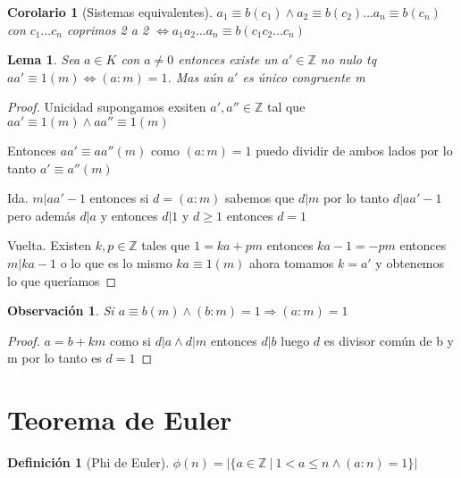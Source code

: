\documentclass{article}
\theoremstyle{break}
\newtheorem{corollary}{Corolario}[theorem]
\newtheorem{lemma}[theorem]{Lema}
\newtheorem*{remark}{Observación}
\newtheorem{definition}{Definición}[section]
\def \Z{\mathbb{Z}}
\begin{document}
        \begin{corollary}[Sistemas equivalentes]
            $a_1\equiv b (c_1) \land a_2\equiv b (c_2) \ldots a_n\equiv b(c_n)$ con $c_1\ldots c_n$ coprimos
            2 a 2 $\iff a_1a_2\ldots a_n \equiv b (c_1c_2\ldots c_n)$ 
        \end{corollary}


        \begin{lemma}
            Sea $a\in K$ con $a\neq 0$ entonces existe un $a'\in\Z$ no nulo tq $aa' \equiv 1(m) \iff (a:m)=1$.
            Mas aún $a'$ es único congruente m
        \end{lemma}
        \begin{proof}
            Unicidad supongamos exsiten $a',a''\in\Z$ tal que $aa'\equiv 1(m) \land aa''\equiv 1(m)$

            Entonces $aa'\equiv aa''(m)$ como $(a:m)=1$ puedo dividir de ambos lados
            por lo tanto $a'\equiv a'' (m)$

            Ida. $m|aa'-1$ entonces si $d=(a:m)$ sabemos que $d|m$ por lo tanto $d|aa'-1$ pero además 
             $d|a$ y entonces $d|1$ y $d\geq 1$ entonces $d=1$
            
            Vuelta. Existen $k,p\in\Z$ tales que $1 = ka + pm$ entonces $ka-1 = -pm$ entonces $m|ka-1$
            o lo que es lo mismo $ka\equiv 1(m)$ ahora tomamos $k=a'$ y obtenemos lo que queríamos
        \end{proof}

        \begin{remark}
            Si $a\equiv b(m) \land (b:m)=1 \Rightarrow (a:m)=1$
        \end{remark}
        \begin{proof}
            $a=b+km$ como si $d|a \land d|m$ entonces $d|b$ luego $d$ es divisor común de b y m
            por lo tanto es $d=1$
        \end{proof}


        \section{Teorema de Euler}
        \begin{definition}[Phi de Euler]
            $\phi (n) = | \{a\in\Z \ | \ 1<a\leq n \land (a:n)=1 \}|$
            
        \end{definition}
        
\end{document}
